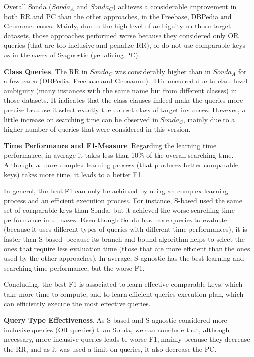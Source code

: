 Overall Sonda ($Sonda_A$ and $Sonda_C$) achieves a considerable improvement in both RR and PC than the other approaches, in the Freebase, DBPedia and Geonames cases. Mainly, due to the high level of ambiguity on those target datasets, those approaches performed worse because they considered only OR queries (that are too inclusive and penalize RR), or do not use comparable keys as in the cases of S-agnostic (penalizing PC).  

\textbf{Class Queries}. The RR in $Sonda_C$ was considerably higher than in $Sonda_A$ for a few cases (DBPedia, Freebase and Geonames). This occurred due to class level ambiguity (many instances with the same name but from different classes) in those datasets. It indicates that the class clauses indeed make the queries more precise because it select exactly the correct class of target instances. However, a little increase on searching time can be observed in $Sonda_C$, mainly due to a higher number of queries that were considered in this version.

\textbf{Time Performance and F1-Measure}. Regarding the learning time performance, in average it takes less than 10\% of the overall searching time. Although, a more complex learning process (that produces better comparable keys) takes more time, it leads to a better F1. 

In general, the best F1 can only be achieved by using an complex learning process and an efficient execution process. For instance, S-based used the same set of comparable keys than Sonda, but it achieved the worse searching time performance in all cases. Even though Sonda has more queries to evaluate (because it uses different types of queries with different time performances), it is faster than S-based, because its  branch-and-bound algorithm helps to select the ones that require less evaluation time (those that are more efficient than the ones used by the other approaches).  In average, S-agnostic has the best learning and searching time performance, but the worse F1. 

Concluding, the best F1 is associated to learn effective comparable keys, which take more time to compute, and to learn efficient queries execution plan, which can efficiently execute the most effective queries. 
 
\textbf{Query Type Effectiveness}. As S-based and S-agnostic considered more inclusive queries (OR queries) than Sonda, we can conclude that, although necessary, more inclusive queries leads to worse F1, mainly because they decrease the RR, and as it was used a limit on queries, it also decrease the PC. 

